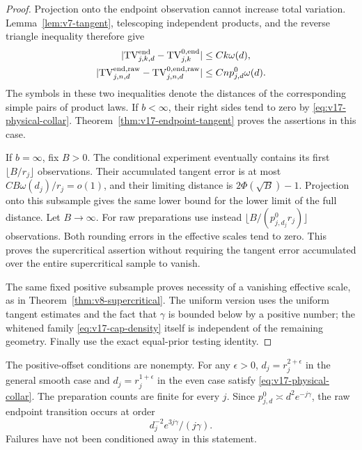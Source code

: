 \begin{proof}
Projection onto the endpoint observation cannot increase total variation.
Lemma~\ref{lem:v7-tangent}, telescoping independent products, and the
reverse triangle inequality therefore give
\begin{align}
 |\mathrm{TV}^{\rm end}_{j,k,d}-\mathrm{TV}^{0,\rm end}_{j,k}|
                   &\le Ck\omega(d),\label{eq:v17-transfer-conditional}\\
 |\mathrm{TV}^{\rm end,raw}_{j,n,d}
                  -\mathrm{TV}^{0,\rm end,raw}_{j,n,d}|
                   &\le Cnp_{j,d}^0\omega(d).
                                           \label{eq:v17-transfer-raw}
\end{align}
The symbols in these two inequalities denote the distances of the
corresponding simple pairs of product laws. If $b<\infty$, their
right sides tend to zero by \eqref{eq:v17-physical-collar}.
Theorem~\ref{thm:v17-endpoint-tangent} proves the assertions in this
case.

If $b=\infty$, fix $B>0$. The conditional experiment eventually
contains its first $\lfloor B/r_j\rfloor$ observations. Their
accumulated tangent error is at most
$CB\omega(d_j)/r_j=o(1)$, and their limiting distance is
$2\Phi(\sqrt B)-1$. Projection onto this subsample gives the same
lower bound for the lower limit of the full distance. Let $B\to\infty$.
For raw preparations use instead
$\lfloor B/(p_{j,d_j}^0r_j)\rfloor$ observations.
Both rounding errors in the effective scales tend to zero.
This proves the supercritical assertion without requiring the tangent
error accumulated over the entire supercritical sample to vanish.

The same fixed positive subsample proves necessity of a vanishing
effective scale, as in Theorem~\ref{thm:v8-supercritical}.
The uniform version uses the uniform tangent estimates and the fact that
$\gamma$ is bounded below by a positive number; the whitened family
\eqref{eq:v17-cap-density} itself is independent of the remaining
geometry. Finally use the exact equal-prior testing identity.
\end{proof}

The positive-offset conditions are nonempty. For any $\epsilon>0$,
$d_j=r_j^{2+\epsilon}$ in the general smooth case and
$d_j=r_j^{1+\epsilon}$ in the even case satisfy
\eqref{eq:v17-physical-collar}. The preparation counts are finite for
every $j$. Since $p_{j,d}^0\asymp d^2e^{-j\gamma}$, the raw
endpoint transition occurs at order
\[
                         d_j^{-2}e^{3j\gamma}/(j\gamma).
\]
Failures have not been conditioned away in this statement.


